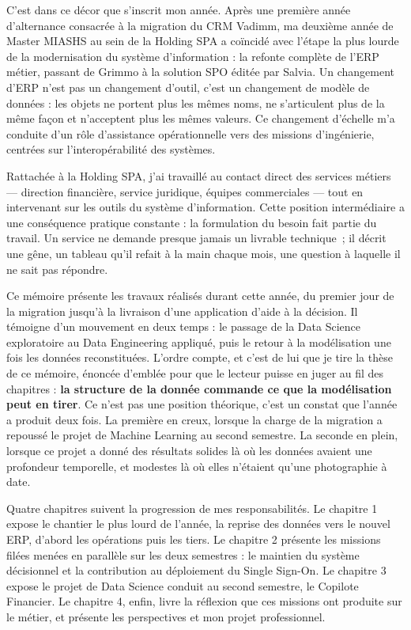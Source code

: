 C'est dans ce décor que s'inscrit mon année. Après une première année d'alternance consacrée à
la migration du CRM Vadimm, ma deuxième année de Master MIASHS au sein de la Holding SPA a
coïncidé avec l'étape la plus lourde de la modernisation du système d'information : la refonte
complète de l'ERP métier, passant de Grimmo à la solution SPO éditée par Salvia. Un changement
d'ERP n'est pas un changement d'outil, c'est un changement de modèle de données : les objets ne
portent plus les mêmes noms, ne s'articulent plus de la même façon et n'acceptent plus les
mêmes valeurs. Ce changement d'échelle m'a conduite d'un rôle d'assistance opérationnelle vers
des missions d'ingénierie, centrées sur l'interopérabilité des systèmes.

Rattachée à la Holding SPA, j'ai travaillé au contact direct des services métiers --- direction
financière, service juridique, équipes commerciales --- tout en intervenant sur les outils du
système d'information. Cette position intermédiaire a une conséquence pratique constante : la
formulation du besoin fait partie du travail. Un service ne demande presque jamais un livrable
technique~; il décrit une gêne, un tableau qu'il refait à la main chaque mois, une question à
laquelle il ne sait pas répondre.

Ce mémoire présente les travaux réalisés durant cette année, du premier jour de la migration
jusqu'à la livraison d'une application d'aide à la décision. Il témoigne d'un mouvement en deux
temps : le passage de la Data Science exploratoire au Data Engineering appliqué, puis le retour
à la modélisation une fois les données reconstituées. L'ordre compte, et c'est de lui que je
tire la thèse de ce mémoire, énoncée d'emblée pour que le lecteur puisse en juger au fil des
chapitres : \textbf{la structure de la donnée commande ce que la modélisation peut en tirer}. Ce
n'est pas une position théorique, c'est un constat que l'année a produit deux fois. La première
en creux, lorsque la charge de la migration a repoussé le projet de Machine Learning au second
semestre. La seconde en plein, lorsque ce projet a donné des résultats solides là où les
données avaient une profondeur temporelle, et modestes là où elles n'étaient qu'une
photographie à date.

Quatre chapitres suivent la progression de mes responsabilités. Le chapitre 1 expose le
chantier le plus lourd de l'année, la reprise des données vers le nouvel ERP, d'abord les
opérations puis les tiers. Le chapitre 2 présente les missions filées menées en parallèle sur
les deux semestres : le maintien du système décisionnel et la contribution au déploiement du
Single Sign-On. Le chapitre 3 expose le projet de Data Science conduit au second semestre, le
Copilote Financier. Le chapitre 4, enfin, livre la réflexion que ces missions ont produite sur
le métier, et présente les perspectives et mon projet professionnel.

